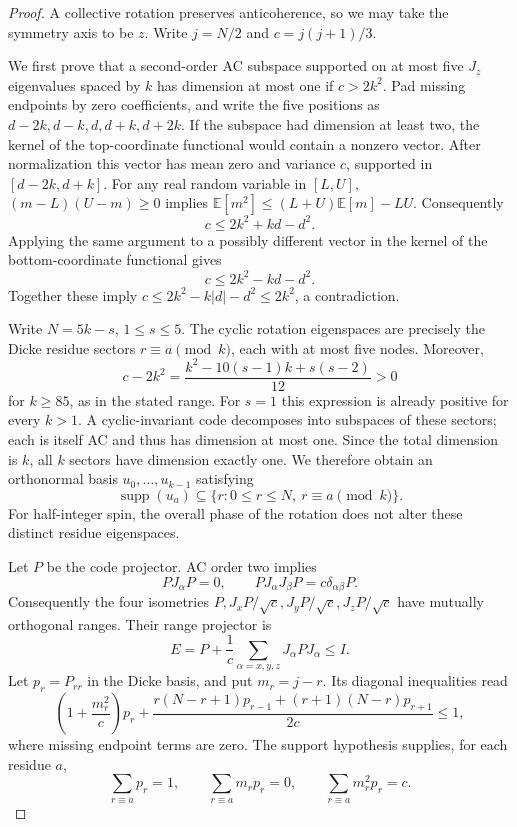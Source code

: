 \documentclass[11pt]{article}
\begin{document}
\begin{proof}
A collective rotation preserves anticoherence, so we may take the symmetry
axis to be $z$. Write $j=N/2$ and $c=j(j+1)/3$.

We first prove that a second-order AC subspace supported on at most five
$J_z$ eigenvalues spaced by $k$ has dimension at most one if $c>2k^2$.
Pad missing endpoints by zero coefficients, and write the five positions as
$d-2k,d-k,d,d+k,d+2k$. If the subspace had dimension at least two, the kernel
of the top-coordinate functional would contain a nonzero vector. After
normalization this vector has mean zero and variance $c$, supported in
$[d-2k,d+k]$. For any real random variable in $[L,U]$,
$(m-L)(U-m)\ge0$ implies
$\mathbb E[m^2]\le(L+U)\mathbb E[m]-LU$. Consequently
\[
 c\le 2k^2+kd-d^2.
\]
Applying the same argument to a possibly different vector in the kernel of
the bottom-coordinate functional gives
\[
 c\le2k^2-kd-d^2.
\]
Together these imply $c\le2k^2-k|d|-d^2\le2k^2$, a contradiction.

Write $N=5k-s$, $1\le s\le5$. The cyclic rotation eigenspaces are precisely
the Dicke residue sectors $r\equiv a\pmod k$, each with at most five nodes.
Moreover,
\[
 c-2k^2=\frac{k^2-10(s-1)k+s(s-2)}{12}>0
\]
for $k\ge85$, as in the stated range. For $s=1$ this expression is already
positive for every $k>1$. A cyclic-invariant code decomposes into subspaces
of these sectors; each is itself AC and thus has dimension at most one.
Since the total dimension is $k$, all $k$ sectors have dimension exactly one.
We therefore obtain an orthonormal basis $u_0,\ldots,u_{k-1}$ satisfying
\[
 \operatorname{supp}(u_a)\subseteq
 \{r:0\le r\le N,\ r\equiv a\pmod k\}.
\]
For half-integer spin, the overall phase of the rotation does not alter
these distinct residue eigenspaces.

Let $P$ be the code projector. AC order two implies
\[
 PJ_\alpha P=0,\qquad PJ_\alpha J_\beta P=c\delta_{\alpha\beta}P.
\]
Consequently the four isometries $P,J_xP/\sqrt c,J_yP/\sqrt c,J_zP/\sqrt c$
have mutually orthogonal ranges. Their range projector is
\[
 E=P+\frac1c\sum_{\alpha=x,y,z}J_\alpha PJ_\alpha\le I.
\]
Let $p_r=P_{rr}$ in the Dicke basis, and put $m_r=j-r$. Its diagonal
inequalities read
\[
 \left(1+\frac{m_r^2}{c}\right)p_r+
 \frac{r(N-r+1)p_{r-1}+(r+1)(N-r)p_{r+1}}{2c}\le1,
 \tag{1}
\]
where missing endpoint terms are zero. The support hypothesis supplies,
for each residue $a$,
\[
 \sum_{r\equiv a}p_r=1,\qquad
 \sum_{r\equiv a}m_rp_r=0,\qquad
 \sum_{r\equiv a}m_r^2p_r=c. \tag{2}
\]


\end{proof}
\end{document}
